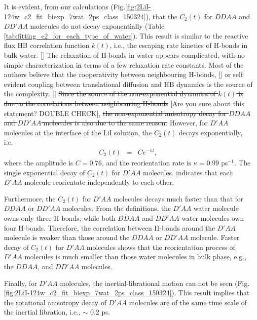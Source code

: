 It is evident, from our calculations (Fig.\space\ref{fig:2LiI-124w_c2_fit_biexp_7wat_2ps_class_150324}), that the $C_2(t)$ for $DDAA$ and $DD'AA$ molecules do not decay exponentially (Table \ref{tab:fitting_c2_for_each_type_of_water}).
This result is similar to the reactive flux HB correlation function $k(t)$, i.e., 
the escaping rate kinetics of H-bonds in bulk water. [\cite{Luzar1996}] 
{\color{blue}The relaxation of H-bonds in water appears complicated, with no simple characterization in terms of a few relaxation rate constants. 
Most of the authors believe that the cooperativity between neighbouring H-bonds, [\cite{Sciortino1989, Ohmine1995}] or 
self evident coupling between translational diffusion and HB dynamics is the source of the complexity. [\cite{Luzar1996}}] 
\st{Since the source of the non-exponential dynamics of $k(t)$ is due to the correlations 
between neighbouring H-bonds} {\color{red}[Are you sure about this statement? DOUBLE CHECK]}, \st{the non-exponential anisotropy decay 
for $DDAA$ and $DD'AA$ molecules is also due to the same reason.} 
However, for $D'AA$ molecules at the interface of the LiI solution,
the $C_2(t)$ decays exponentially, i.e.
\begin{eqnarray}
  C_2(t) &=& C e^{-{\kappa}t},
\label{eq:C_2_D_prime_AA}
\end{eqnarray}
where the amplitude is $C=0.76$, and the reorientation rate is $\kappa = 0.99$ ps$^{-1}$.
The single exponential decay of $C_2(t)$ for $D'AA$ molecules, indicates that each $D'AA$  molecule reorientate independently to each other. 

Furthermore, the $C_2(t)$ for $D'AA$ molecules decays much faster than that for $DDAA$ or $DD'AA$ molecules.
From the definitions, the $D'AA$ water molecule owns only three H-bonds, while both $DDAA$ and $DD'AA$ water molecules own four H-bonds.
Therefore, the correlation between H-bonds around the $D'AA$ molecule is weaker than those around the $DDAA$ or $DD'AA$ molecule. 
Faster decay of $C_2(t)$ for $D'AA$ molecules shows that the reorientation process of $D'AA$
molecules is much smaller than those water molecules in bulk phase, e.g., the $DDAA$, and $DD'AA$ molecules.

Finally, for $D'AA$ molecules, the inertial-librational motion can not be seen (Fig.\space\ref{fig:2LiI-124w_c2_fit_biexp_7wat_2ps_class_150324}). 
This result implies that the rotational anisotropy decay of $D'AA$ molecules
are of the same time scale of the inertial libration, i.e., $\sim$ 0.2 ps.

